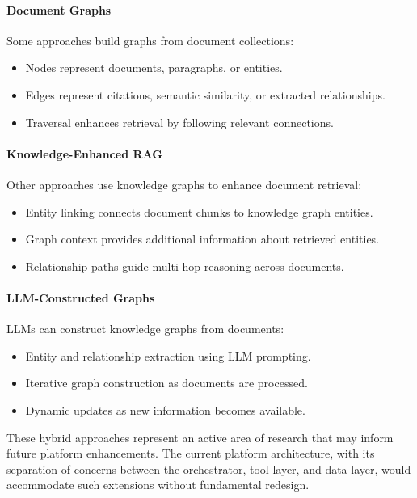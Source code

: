 \documentclass[a4paper,twoside]{sapthesis}
\begin{document}
\paragraph{Document Graphs}

Some approaches build graphs from document collections:
\begin{itemize}
    \item Nodes represent documents, paragraphs, or entities.
    \item Edges represent citations, semantic similarity, or extracted relationships.
    \item Traversal enhances retrieval by following relevant connections.
\end{itemize}

\paragraph{Knowledge-Enhanced RAG}

Other approaches use knowledge graphs to enhance document retrieval:
\begin{itemize}
    \item Entity linking connects document chunks to knowledge graph entities.
    \item Graph context provides additional information about retrieved entities.
    \item Relationship paths guide multi-hop reasoning across documents.
\end{itemize}

\paragraph{LLM-Constructed Graphs}

LLMs can construct knowledge graphs from documents:
\begin{itemize}
    \item Entity and relationship extraction using LLM prompting.
    \item Iterative graph construction as documents are processed.
    \item Dynamic updates as new information becomes available.
\end{itemize}

These hybrid approaches represent an active area of research that may inform future platform enhancements. The current platform architecture, with its separation of concerns between the orchestrator, tool layer, and data layer, would accommodate such extensions without fundamental redesign.
\end{document}
